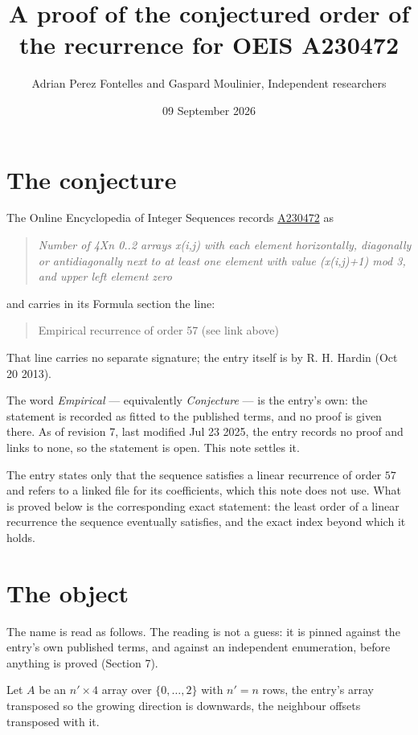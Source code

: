 \documentclass[11pt]{article}
\title{A proof of the conjectured order of the recurrence for OEIS A230472}
\author{Adrian Perez Fontelles and Gaspard Moulinier, Independent researchers}
\date{09 September 2026}
\theoremstyle{definition}
\begin{document}
\maketitle
\section{The conjecture}

The Online Encyclopedia of Integer Sequences records \href{https://oeis.org/A230472}{A230472} as

\begin{quote}\itshape Number of 4Xn 0..2 arrays x(i,j) with each element horizontally, diagonally or antidiagonally next to at least one element with value (x(i,j)+1) mod 3, and upper left element zero\end{quote}

and carries in its Formula section the line:

\begin{quote}\ttfamily Empirical recurrence of order 57 (see link above)\end{quote}

That line carries no separate signature; the entry itself is by R. H. Hardin (Oct 20 2013).

The word {\itshape Empirical} --- equivalently {\itshape Conjecture} --- is the entry's own: the statement is recorded as fitted to the published terms, and no proof is given there. As of revision 7, last modified Jul 23 2025, the entry records no proof and links to none, so the statement is open. This note settles it.

The entry states only that the sequence satisfies a linear recurrence of order $57$ and refers to a linked file for its coefficients, which this note does not use. What is proved below is the corresponding exact statement: the least order of a linear recurrence the sequence eventually satisfies, and the exact index beyond which it holds.

\section{The object}

The name is read as follows. The reading is not a guess: it is pinned against the entry's own published terms, and against an independent enumeration, before anything is proved (Section 7).

Let $A$ be an $n' \times 4$ array over $\{0,\dots,2\}$ with $n' = n$ rows, the entry's array transposed so the growing direction is downwards, the neighbour offsets transposed with it.
\end{document}
